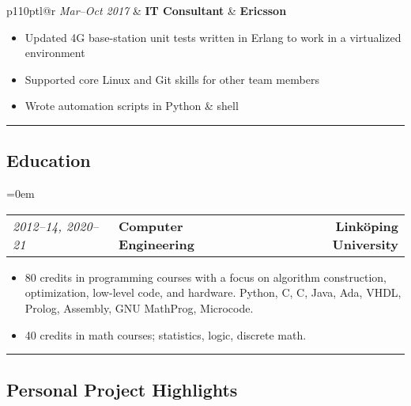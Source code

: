 \documentclass[10pt,letterpaper]{article}
\makeatletter
\newcommand{\threeheaderrow}[3]
{\begin{tabular*}{\linewidth}{p{110pt}l@{\extracolsep{\fill}}r}
    #1 &
    #2 &
    #3 \\
\end{tabular*}}
\newcommand{\CPP}
{C\nolinebreak[4]\hspace{-.05em}\raisebox{.22ex}{\footnotesize\bf ++}}
\makeatother
\begin{document}
\threeheaderrow
{\emph{Mar--Oct 2017}}
{\textbf{IT Consultant}}
{\textbf{Ericsson}}
\begin{itemize}[noitemsep, topsep=1pt]
    \item Updated 4G base-station unit tests written in
        Erlang to work in a virtualized environment
    \item Supported core Linux and Git skills for other team members
    \item Wrote automation scripts in Python \& shell
\end{itemize}
\vspace{1em}



\hrule
\vspace{-0.4em}
\subsection*{Education}
\parindent=0em

\threeheaderrow
    {\emph{2012--14, 2020--21}}
    {\textbf{Computer Engineering}}
    {\textbf{Linköping University}}
\begin{itemize}[noitemsep, topsep=1pt]
    \item  80 credits in programming courses with a focus on algorithm construction, optimization, low-level code, and hardware. Python, \CPP, C, Java, Ada, VHDL, Prolog, Assembly, GNU MathProg, Microcode.  
    \item 40 credits in math courses; statistics, logic, discrete math.
\end{itemize}
\vspace{1em}

\hrule
\vspace{-0.4em}
\subsection*{Personal Project Highlights}

\end{document}
